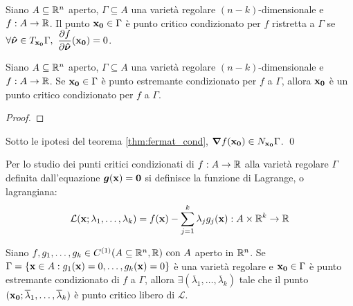 \begin{definition}
    Siano $A\subseteq\mathbb{R}^n$ aperto, $\Gamma \subseteq A$ una varietà regolare $(n-k)$-dimensionale e $f: A\to\mathbb{R}$. Il punto $\vb{x_0} \in \Gamma$ è punto critico condizionato per $f$ ristretta a $\Gamma$ se $\forall \bm{\hat{\nu}} \in T_{\vb{x_0}}\Gamma, \ \displaystyle\frac{\partial f}{\partial \bm{\hat{\nu}}}(\vb{x_0})=0$. 
\end{definition}

\begin{theorem}
    \label{thm:fermat_cond}
    Siano $A\subseteq\mathbb{R}^n$ aperto, $\Gamma \subseteq A$ una varietà regolare $(n-k)$-dimensionale e $f: A\to\mathbb{R}$. Se $\vb{x_0} \in \Gamma$ è punto estremante condizionato per $f$ a $\Gamma$, allora $\vb{x_0}$ è un punto critico condizionato per $f$ a $\Gamma$.
\end{theorem}

\begin{proof}
    
\end{proof}

\begin{corollary}
    Sotto le ipotesi del teorema \ref{thm:fermat_cond}, $\grad f (\vb{x_0}) \in N_{\vb{x_0}}\Gamma$.
    \qed
\end{corollary}

\begin{definition}
    Per lo studio dei punti critici condizionati di $f: A\to \mathbb{R}$ alla varietà regolare $\Gamma$ definita dall'equazione $\bm g (\vb{x})=\vb{0}$ si definisce la funzione di Lagrange, o lagrangiana:
    \begin{equation*}
        \displaystyle \mathcal{L}(\vb{x};\lambda_1,\dots,\lambda_k)=f(\vb{x})-\sum_{j=1}^k \lambda_j g_j(\vb{x}) : A \times \mathbb{R}^k \to \mathbb{R}
    \end{equation*}
\end{definition}

\begin{theorem}
    Siano $f,g_1,\dots,g_k \in C^{(1)}(A\subseteq\mathbb{R}^n, \mathbb{R}) \text{ con } A$ aperto in $\mathbb{R}^n$. Se $\Gamma = \{ \vb{x} \in A: g_1 (\vb{x})=0, \dots, g_k(\vb{x})=0 \}$ è una varietà regolare e $\vb{x_0} \in \Gamma$ è punto estremante condizionato di $f$ a $\Gamma$, allora $\exists (\overline{\lambda}_1, \dots,\overline{\lambda}_k)$ tale che il punto $(\vb{x_0}; \overline{\lambda}_1,\dots,\overline{\lambda}_k)$ è punto critico libero di $\mathcal{L}$.
\end{theorem}

